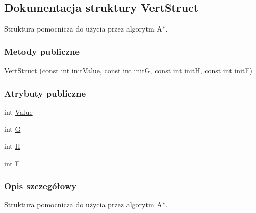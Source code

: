 \hypertarget{struct_vert_struct}{\subsection{Dokumentacja struktury Vert\-Struct}
\label{struct_vert_struct}
}


Struktura pomocnicza do użycia przez algorytm A$\ast$.  


\subsubsection*{Metody publiczne}
\begin{DoxyCompactItemize}
\item 
\hyperlink{struct_vert_struct_a198e03338b2c3077c84483be09e31719}{Vert\-Struct} (const int init\-Value, const int init\-G, const int init\-H, const int init\-F)
\end{DoxyCompactItemize}
\subsubsection*{Atrybuty publiczne}
\begin{DoxyCompactItemize}
\item 
int \hyperlink{struct_vert_struct_a32ac50c294f04ae8a1ba461132fb94d3}{Value}
\item 
int \hyperlink{struct_vert_struct_af4b8dc4824f29f8c5348f119bf9efeab}{G}
\item 
int \hyperlink{struct_vert_struct_a834a3bada64b1a1b64a0d6f6ccb0961e}{H}
\item 
int \hyperlink{struct_vert_struct_a191e0550b0fadcb00a3168f8de44870e}{F}
\end{DoxyCompactItemize}


\subsubsection{Opis szczegółowy}
Struktura pomocnicza do użycia przez algorytm A$\ast$. 



